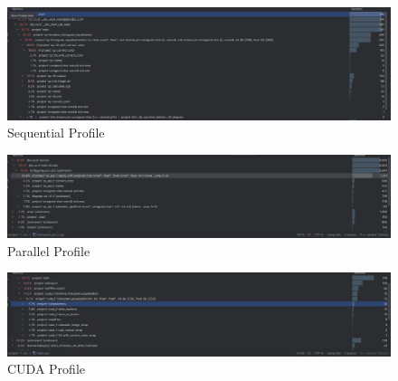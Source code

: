 \documentclass[sigconf]{acmart}
\begin{document}
    \appendix
    \begin{figure}
        \centering
        \includegraphics[width=\linewidth]{seqprofile.png}
        \caption{Sequential Profile}
        \label{fig:seqprofile}
    \end{figure}

    \begin{figure}
        \centering
        \includegraphics[width=\linewidth]{parprofile.png}
        \caption{Parallel Profile}
        \label{fig:parprofile}
    \end{figure}

    \begin{figure}
        \centering
        \includegraphics[width=\textwidth]{cudaprofile.png}
        \caption{CUDA Profile}
        \label{fig:cudaprofile}
    \end{figure}

    
    
\end{document}
